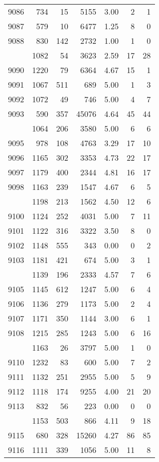 \documentclass[
]{article}
\begin{document}
\begin{table}
\begin{tabular}[t]{lrrrrrr}
9086 & 734 & 15 & 5155 & 3.00 & 2 & 1\\
9087 & 579 & 10 & 6477 & 1.25 & 8 & 0\\
9088 & 830 & 142 & 2732 & 1.00 & 1 & 0\\
\addlinespace
9089 & 1082 & 54 & 3623 & 2.59 & 17 & 28\\
9090 & 1220 & 79 & 6364 & 4.67 & 15 & 1\\
9091 & 1067 & 511 & 689 & 5.00 & 1 & 3\\
9092 & 1072 & 49 & 746 & 5.00 & 4 & 7\\
9093 & 590 & 357 & 45076 & 4.64 & 45 & 44\\
\addlinespace
9094 & 1064 & 206 & 3580 & 5.00 & 6 & 6\\
9095 & 978 & 108 & 4763 & 3.29 & 17 & 10\\
9096 & 1165 & 302 & 3353 & 4.73 & 22 & 17\\
9097 & 1179 & 400 & 2344 & 4.81 & 16 & 17\\
9098 & 1163 & 239 & 1547 & 4.67 & 6 & 5\\
\addlinespace
9099 & 1198 & 213 & 1562 & 4.50 & 12 & 6\\
9100 & 1124 & 252 & 4031 & 5.00 & 7 & 11\\
9101 & 1122 & 316 & 3322 & 3.50 & 8 & 0\\
9102 & 1148 & 555 & 343 & 0.00 & 0 & 2\\
9103 & 1181 & 421 & 674 & 5.00 & 3 & 1\\
\addlinespace
9104 & 1139 & 196 & 2333 & 4.57 & 7 & 6\\
9105 & 1145 & 612 & 1247 & 5.00 & 6 & 4\\
9106 & 1136 & 279 & 1173 & 5.00 & 2 & 4\\
9107 & 1171 & 350 & 1144 & 3.00 & 6 & 1\\
9108 & 1215 & 285 & 1243 & 5.00 & 6 & 16\\
\addlinespace
9109 & 1163 & 26 & 3797 & 5.00 & 1 & 0\\
9110 & 1232 & 83 & 600 & 5.00 & 7 & 2\\
9111 & 1132 & 251 & 2955 & 5.00 & 5 & 9\\
9112 & 1118 & 174 & 9255 & 4.00 & 21 & 20\\
9113 & 832 & 56 & 223 & 0.00 & 0 & 0\\
\addlinespace
9114 & 1153 & 503 & 866 & 4.11 & 9 & 18\\
9115 & 680 & 328 & 15260 & 4.27 & 86 & 85\\
9116 & 1111 & 339 & 1056 & 5.00 & 11 & 8\\

\end{tabular}
\end{table}
\end{document}
